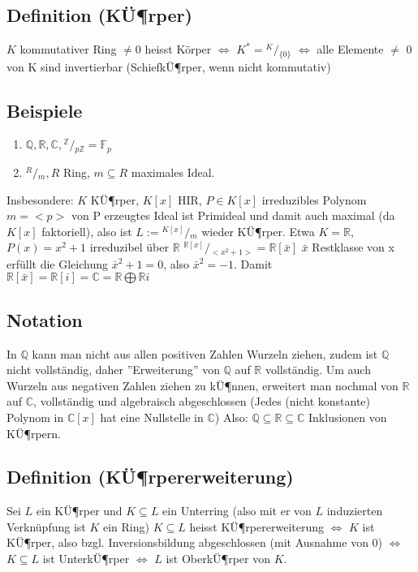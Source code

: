\documentclass[12pt,a4paper,ngerman]{scrreprt}
\newcommand{\modulus}[2]{{}^{#1} \!/\!_{#2}}
\begin{document}
\subsection{Definition (KÜ¶rper)}
$K$ kommutativer Ring $\neq 0$ heisst Körper $\Leftrightarrow$ $K^* = \modulus{K}{\{0\}}$ 
$\Leftrightarrow$ alle Elemente $\neq$ 0 von K sind invertierbar
(SchiefkÜ¶rper, wenn nicht kommutativ)
\subsection{Beispiele}
\begin{enumerate}[]
\item $\mathbb{Q}, \mathbb{R}, \mathbb{C}, \modulus{\mathbb{Z}}{p\mathbb{Z}} = \mathbb{F}_p$
\item $\modulus{R}{m}, R$ Ring, $m \subseteq R$ maximales Ideal.
\end{enumerate}

Insbesondere: $K$ KÜ¶rper, $K[x]$ HIR, $P \in K[x]$ irreduzibles Polynom $m = <p>$
von P erzeugtes Ideal ist Primideal und damit auch maximal (da $K[x]$ faktoriell),
also ist $L := \modulus{K[x]}{m}$ wieder KÜ¶rper. 
Etwa $K = \mathbb{R}$, $P(x) = x^2 + 1$ irreduzibel über $\mathbb{R}$
$\modulus{\mathbb{R}[x]}{<x^2 + 1>} = \mathbb{R}[\bar{x}]$
$\bar{x}$ Restklasse von x erfüllt die Gleichung $\bar{x}^2 + 1 = 0$, also $\bar{x}^2 = -1$.
Damit $\mathbb{R}[\bar{x}] = \mathbb{R}[i] = \mathbb{C} = \mathbb{R} \bigoplus \mathbb{R}i$

\subsection{Notation}

In $\mathbb{Q}$ kann man nicht aus allen positiven Zahlen Wurzeln ziehen,
zudem ist $\mathbb{Q}$ nicht vollständig, 
daher ''Erweiterung'' von $\mathbb{Q}$ auf $\mathbb{R}$ vollständig.
Um auch Wurzeln aus negativen Zahlen ziehen zu kÜ¶nnen, erweitert man nochmal von
$\mathbb{R}$ auf $\mathbb{C}$, vollständig und algebraisch abgeschlossen 
(Jedes (nicht konstante) Polynom in $\mathbb{C}[x]$ hat eine Nullstelle in $\mathbb{C}$)
Also: $\mathbb{Q} \subseteq \mathbb{R} \subseteq \mathbb{C}$ Inklusionen von KÜ¶rpern.

\subsection{Definition (KÜ¶rpererweiterung)}
Sei $L$ ein KÜ¶rper und $K \subseteq L$ ein Unterring 
(also mit er von $L$ induzierten Verknüpfung ist $K$ ein Ring)
$K \subseteq L$ heisst KÜ¶rpererweiterung $\Leftrightarrow$ 
$K$ ist KÜ¶rper, also bzgl. Inversionsbildung abgeschlossen (mit Ausnahme von 0)
$\Leftrightarrow$ $K \subseteq L$ ist UnterkÜ¶rper $\Leftrightarrow$ $L$ ist OberkÜ¶rper von $K$.
\end{document}
